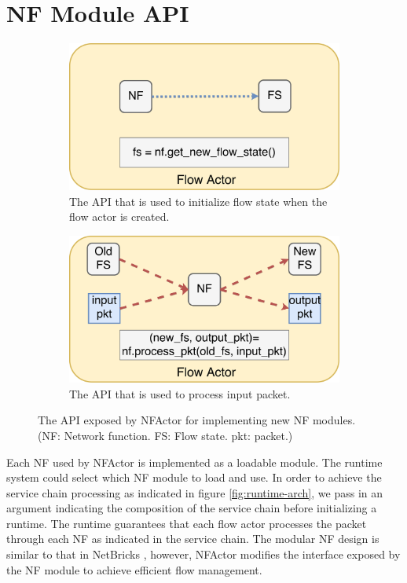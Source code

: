 \section{NF Module API}

\begin{figure}[!h]
\begin{subfigure}[t]{0.49\linewidth}
   \centering
   \includegraphics[width=\columnwidth]{figure/nf-module-api-init.pdf}
   \caption{The API that is used to initialize flow state when the flow actor is created.}\label{fig:init-api}
  \end{subfigure}\hfill
  \begin{subfigure}[t]{0.49\linewidth}
 \centering
   \includegraphics[width=\columnwidth]{figure/nf-module-api-process_pkt.pdf}
   \caption{The API that is used to process input packet.}\label{fig:pkt-process-api} \end{subfigure}\hfill
 \caption{The API exposed by NFActor for implementing new NF modules. (NF: Network function. FS: Flow state. pkt: packet.)}
\label{fig:api}
\end{figure}

Each NF used by NFActor is implemented as a loadable module. The runtime system could select which NF module to load and use. In order to achieve the service chain processing as indicated in figure \ref{fig:runtime-arch}, we pass in an argument indicating the composition of the service chain before initializing a runtime. The runtime guarantees that each flow actor processes the packet through each NF as indicated in the service chain. The modular NF design is similar to that in NetBricks \cite{199352}, however, NFActor modifies the interface exposed by the NF module to achieve efficient flow management.


